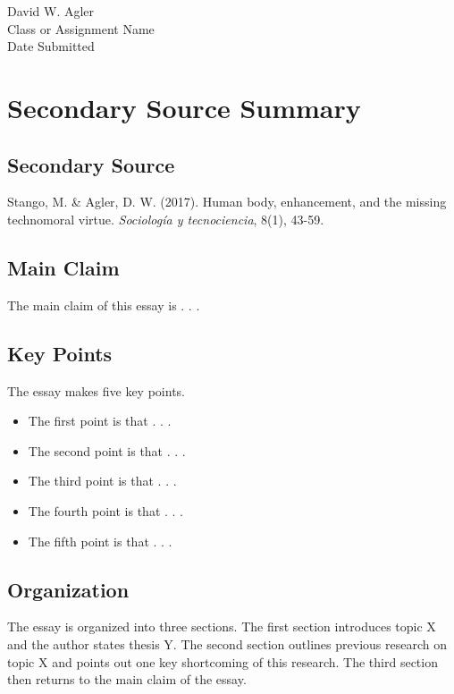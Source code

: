 David W. Agler\\
Class or Assignment Name\\
Date Submitted

\section{Secondary Source Summary}\label{secondary-source-summary}

\subsection{Secondary Source}\label{secondary-source}

Stango, M. \& Agler, D. W. (2017). Human body, enhancement, and the
missing technomoral virtue. \emph{Sociología y tecnociencia}, 8(1),
43-59.

\subsection{Main Claim}\label{main-claim}

The main claim of this essay is . . .

\subsection{Key Points}\label{key-points}

The essay makes five key points.

\begin{itemize}
\tightlist
\item
  The first point is that . . .
\item
  The second point is that . . .
\item
  The third point is that . . .
\item
  The fourth point is that . . .
\item
  The fifth point is that . . .
\end{itemize}

\subsection{Organization}\label{organization}

The essay is organized into three sections. The first section introduces
topic X and the author states thesis Y. The second section outlines
previous research on topic X and points out one key shortcoming of this
research. The third section then returns to the main claim of the essay.
